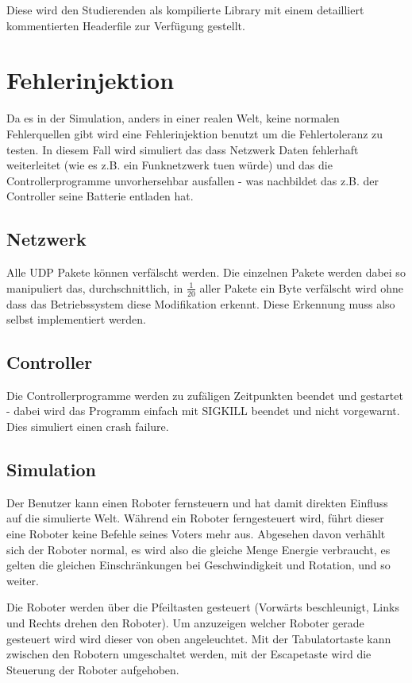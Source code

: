 \documentclass[
    12pt,
    bibliography=totoc,
    ngerman
]{scrartcl}
\begin{document}
Diese wird den Studierenden als kompilierte Library mit einem detailliert kommentierten Headerfile zur Verf{\"{u}}gung gestellt.

\clearpage
\section{Fehlerinjektion}
Da es in der Simulation, anders in einer realen Welt, keine normalen Fehlerquellen gibt wird eine Fehlerinjektion benutzt um die Fehlertoleranz zu testen.
In diesem Fall wird simuliert das dass Netzwerk Daten fehlerhaft weiterleitet (wie es z.B. ein Funknetzwerk tuen w{\"{u}}rde) und das die Controllerprogramme
unvorhersehbar ausfallen - was nachbildet das z.B. der Controller seine Batterie entladen hat.


\subsection{Netzwerk}
Alle UDP Pakete k{\"{o}}nnen verf{\"{a}}lscht werden. Die einzelnen Pakete werden dabei so manipuliert das, durchschnittlich, in $ \frac{1}{20} $ aller Pakete
ein Byte verf{\"{a}}lscht wird ohne dass das Betriebssystem diese Modifikation erkennt. Diese Erkennung muss also selbst implementiert werden.

\subsection{Controller}
Die Controllerprogramme werden zu zuf{\"{a}}ligen Zeitpunkten beendet und gestartet - dabei wird das Programm einfach mit SIGKILL beendet und nicht vorgewarnt. Dies simuliert einen crash failure.

\subsection{Simulation}
Der Benutzer kann einen Roboter fernsteuern und hat damit direkten Einfluss auf die simulierte Welt. W{\"{a}}hrend ein Roboter
ferngesteuert wird, f{\"{u}}hrt dieser eine Roboter keine Befehle seines Voters mehr aus. Abgesehen davon verh{\"{a}}hlt sich der Roboter normal, es wird also die gleiche Menge Energie verbraucht, es gelten die gleichen Einschr{\"{a}}nkungen bei
Geschwindigkeit und Rotation, und so weiter.

Die Roboter werden {\"{u}}ber die Pfeiltasten gesteuert (Vorw{\"{a}}rts beschleunigt, Links und Rechts drehen den Roboter). Um
anzuzeigen welcher Roboter gerade gesteuert wird wird dieser von oben angeleuchtet. Mit der Tabulatortaste kann zwischen den
Robotern umgeschaltet werden, mit der Escapetaste wird die Steuerung der Roboter aufgehoben.
\end{document}
